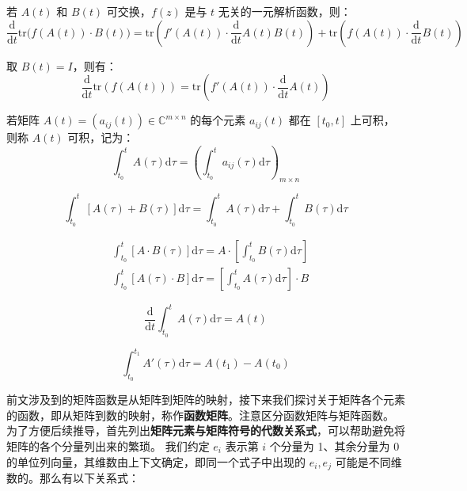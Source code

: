 \begin{property}[迹函数求导基本定理]
若 $A(t)$ 和 $B(t)$ 可交换，$f(z)$ 是与 $t$ 无关的一元解析函数，则：
\[
    \frac{\mathrm d}{\mathrm dt}\mathrm{tr}\big(f(A(t))\cdot B(t)\big)=\mathrm{tr}\left(f'(A(t))\cdot\frac{\mathrm d}{\mathrm dt}A(t)B(t)\right)+\mathrm{tr}\left(f(A(t))\cdot\frac{\mathrm d}{\mathrm dt}B(t)\right)
\]
\end{property}
\begin{corollary}
取 $B(t)=I$，则有：
\[
    \frac{\mathrm d}{\mathrm dt}\mathrm{tr}(f(A(t)))=\mathrm{tr}\left(f'(A(t))\cdot\frac{\mathrm d}{\mathrm dt}A(t)\right)
\]
\end{corollary}

\begin{definition}[矩阵的积分]
若矩阵 $A(t)=(a_{ij}(t))\in\mathbb C^{m\times n}$ 的每个元素 $a_{ij}(t)$ 都在 $[t_0,t]$ 上可积，则称 $A(t)$ 可积，记为：
\[
    \int_{t_0}^t A(\tau)\mathrm d\tau=\left(\int_{t_0}^ta_{ij}(\tau)\mathrm d\tau\right)_{m\times n}
\]
\end{definition}
\begin{property}
\[
    \int_{t_0}^t[A(\tau)+B(\tau)]\mathrm d\tau=\int_{t_0}^tA(\tau)\mathrm d\tau+\int_{t_0}^tB(\tau)\mathrm d\tau
\]
\end{property}
\begin{property}
\begin{align*}
    &\int_{t_0}^t[A\cdot B(\tau)]\mathrm d\tau=A\cdot\left[\int_{t_0}^tB(\tau)\mathrm d\tau\right]\\
    &\int_{t_0}^t[A(\tau)\cdot B]\mathrm d\tau=\left[\int_{t_0}^tA(\tau)\mathrm d\tau\right]\cdot B
\end{align*}
\end{property}
\begin{property}
\[
    \frac{\mathrm d}{\mathrm dt}\int_{t_0}^tA(\tau)\mathrm d\tau=A(t)
\]
\end{property}
\begin{property}
\[
    \int_{t_0}^{t_1}A'(\tau)\mathrm d\tau=A(t_1)-A(t_0)
\]
\end{property}

\vskip 1cm

前文涉及到的矩阵函数是从矩阵到矩阵的映射，接下来我们探讨关于矩阵各个元素的函数，即从矩阵到数的映射，称作\textbf{函数矩阵}。注意区分函数矩阵与矩阵函数。
为了方便后续推导，首先列出\textbf{矩阵元素与矩阵符号的代数关系式}，可以帮助避免将矩阵的各个分量列出来的繁琐。
我们约定 $e_i$ 表示第 $i$ 个分量为 1、其余分量为 0 的单位列向量，其维数由上下文确定，即同一个式子中出现的 $e_i,e_j$ 可能是不同维数的。那么有以下关系式：

